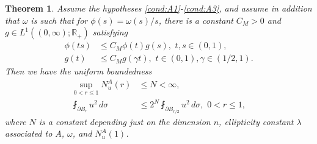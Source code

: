 \documentclass[12pt,leqno]{amsart}
\numberwithin{equation}{section}
\newtheorem{thm}[lemma]{Theorem}
\theoremstyle{definition}
\newcommand{\R}{\mathbb{R}}
\begin{document}
	\begin{thm}\label{thm:freq_bdd}
		Assume the hypotheses \ref{cond:A1}-\ref{cond:A3}, and assume in addition that $\omega$ is such that for $\phi(s) = \omega(s)/s$, there is a constant $C_M > 0$ and $g \in L^1((0,\infty); \R_+)$ satisfying
		\begin{align}
			\phi(ts) & \le C_M \phi(t) g(s),  \, \, t,s \in (0,1), \label{eqn:special_mod} \\
			g(t) & \le C_M g(\gamma t), \, \, t \in (0,1), \gamma \in (1/2, 1). \label{eqn:special_mod2}
		\end{align} 
		Then we have the uniform boundedness
		\begin{align*}
			\sup_{0 < r \le 1} N_u^A(r) & \le N < \infty, \\
			\fint_{\partial B_r } u^2 \, d\sigma & \le 2^{N} \fint_{\partial B_{r/2}} u^2 \, d\sigma, \, \, 0 < r \le 1,
		\end{align*}
		where $N$ is a constant depending just on the dimension $n$, ellipticity constant $\lambda$ associated to $A$, $\omega$, and $N_u^A(1)$. 
	\end{thm}
\end{document}
